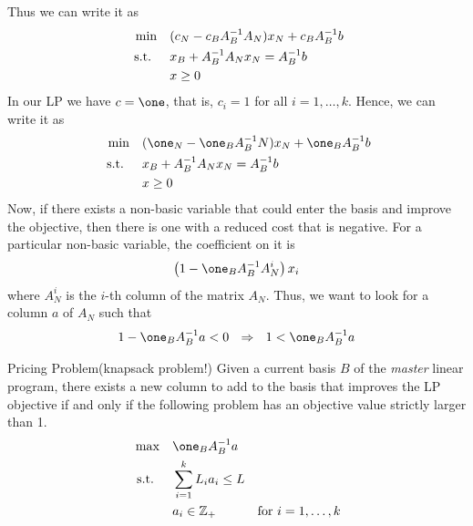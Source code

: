 Thus we can write it as 
 \begin{equation}
 \label{LP:basis-solution2}
\begin{aligned}
\min \quad & (c_N  - c_B A_B^{-1} A_N) x_N + c_B A_B^{-1} b  \\
\mbox{ s.t. } \quad  & x_B +  A_B^{-1} A_N x_N = A_B^{-1}b\\
& x \geq 0
\end{aligned}
\end{equation}
In our LP we have $c = \one$, that is, $c_i =1$ for all $i=1, \dots, k$.  Hence, we can write it as 
 \begin{equation}
 \label{LP:basis-solution3}
\begin{aligned}
\min \quad & (\one_N  - \one_B A_B^{-1} N) x_N + \one_B A_B^{-1} b  \\
\st \quad  & x_B +  A_B^{-1} A_N x_N = A_B^{-1}b\\
& x \geq 0
\end{aligned}
\end{equation}
Now, if there exists a non-basic variable that could enter the basis and improve the objective, then there is one with a reduced cost that is negative.  For a particular non-basic variable, the coefficient on it is
\begin{equation}
\left( 1 -  \one_B A_B^{-1} A_N^i\right) x_i
\end{equation}
where $A_N^i$ is the $i$-th column of the matrix $A_N$.  Thus, we want to look for a column $a$ of $A_N$ such that 
\begin{equation}
1 -  \one_B A_B^{-1} a < 0 \ \  \Rightarrow \ \   1 < \one_B A_B^{-1} a
\end{equation}
\begin{general}{Pricing Problem}{(knapsack problem!)}
Given a current basis $B$ of the \emph{master} linear program, there exists a new column to add to the basis that improves the LP objective if and only if the following problem has an objective value strictly larger than 1.
\begin{align*}
\max \quad & \one_B A_B^{-1} a\\
\st \quad  & \sum_{i=1}^k L_i a_i \leq L\\
& a_i \in \Z_+ & \text{for } i=1, \dots, k
\end{align*}
\end{general}

